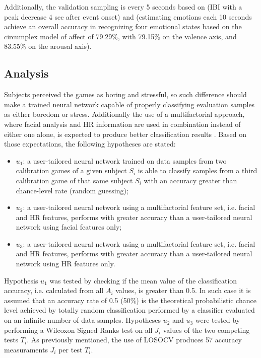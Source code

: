 Additionally, the validation sampling is every 5 seconds based on \parencite{ravaja20051} (IBI with a peak decrease 4 sec after event onset) and \parencite{valenza2014revealing} (estimating emotions each 10 seconds achieve an overall accuracy in recognizing four emotional states based on the circumplex model of affect of 79.29\%, with 79.15\% on the valence axis, and 83.55\% on the arousal axis).

\subsection{Analysis}

Subjects perceived the games as boring and stressful, so such difference should make a trained neural network capable of properly classifying evaluation samples as either boredom or stress. Additionally the use of a multifactorial approach, where facial analysis and HR information are used in combination instead of either one alone, is expected to produce better classification results \parencite{zacharatos2014automatic}. Based on those expectations, the following hypotheses are stated:

\begin{itemize}
  \item $u_1$: a user-tailored neural network trained on data samples from two calibration games of a given subject $S_i$ is able to classify samples from a third calibration game of that same subject $S_i$ with an accuracy greater than chance-level rate (random guessing);
  \item $u_2$: a user-tailored neural network using a multifactorial feature set, i.e. facial and HR features, performs with greater accuracy than a user-tailored neural network using facial features only;
  \item $u_3$: a user-tailored neural network using a multifactorial feature set, i.e. facial and HR features, performs with greater accuracy than a user-tailored neural network using HR features only.
\end{itemize}

Hypothesis $u_1$ was tested by checking if the mean value of the classification accuracy, i.e. calculated from all $A_i$ values, is greater than 0.5. In such case it is assumed that an accuracy rate of 0.5 (50\%) is the theoretical probabilistic chance level achieved by totally random classification performed by a classifier evaluated on an infinite number of data samples. Hypotheses $u_2$ and $u_3$ were tested by performing a Wilcoxon Signed Ranks test on all $J_i$ values of the two competing tests $T_i$. As previously mentioned, the use of LOSOCV produces 57 accuracy measuraments $J_i$ per test $T_i$.


